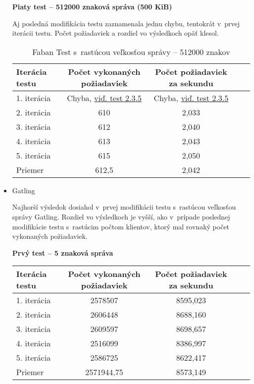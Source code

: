 \documentclass[12pt,oneside,final]{fithesis-utf8}
\begin{document}
\begin{itemize}
\textbf{Piaty test -- 512000 znaková správa (500 KiB)}

Aj posledná modifikácia testu zaznamenala jednu chybu, tentokrát v~prvej iterácii testu. Počet požiadaviek a rozdiel vo výsledkoch opäť klesol.

\begin{table}[H]
\begin{center}
\begin{tabular}{ | l | c | c | c | c |}
		\hline
		 \textbf{Iterácia testu} & \textbf{Počet vykonaných požiadaviek} & \textbf{Počet požiadaviek za sekundu} \\ \hline
		 1. iterácia & Chyba, \hyperlink{label}{viď. test 2.3.5} & Chyba, \hyperlink{label}{viď. test 2.3.5} \\ \hline
		 2. iterácia & 610 & 2,033 \\ \hline
		 3. iterácia & 612 & 2,040 \\ \hline
		 4. iterácia & 613 & 2,043 \\ \hline
		 5. iterácia & 615 & 2,050 \\ \hline
		 Priemer & 612,5 & 2,042 \\ \hline
		 
\end{tabular}
\end{center}
\caption{Faban Test s~rastúcou veľkosťou správy -- 512000 znakov}
\end{table}


\item Gatling

Najhorší výsledok dosiahol v~prvej modifikácii testu s~rastúcou veľkosťou správy Gatling. Rozdiel vo výsledkoch je vyšší, ako v~prípade poslednej modifikácie testu s~rastúcim počtom klientov, ktorý mal rovnaký počet vykonaných požiadaviek. 

\textbf{Prvý test -- 5 znaková správa}

\begin{table}[H]
\begin{center}
\begin{tabular}{ | l | c | c | c | c |}
		\hline
		 \textbf{Iterácia testu} & \textbf{Počet vykonaných požiadaviek} & \textbf{Počet požiadaviek za sekundu} \\ \hline
		 1. iterácia & 2578507 & 8595,023 \\ \hline
		 2. iterácia & 2606448 & 8688,160 \\ \hline
		 3. iterácia & 2609597 & 8698,657 \\ \hline
		 4. iterácia & 2516099 & 8386,997 \\ \hline
		 5. iterácia & 2586725 & 8622,417 \\ \hline
		 Priemer & 2571944,75 & 8573,149 \\ \hline
		 

\end{tabular}
\end{center}
\end{table}
\end{itemize}
\end{document}
